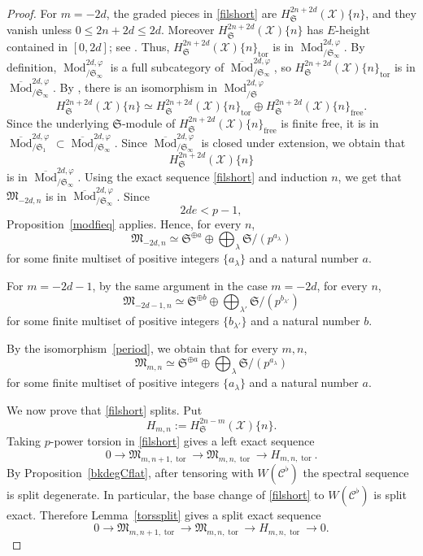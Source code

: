 \documentclass[11pt]{amsart}
\numberwithin{equation}{section}
\newcommand{\sC}{\mathcal{C}}
\newcommand{\BKMod}{\operatorname{Mod}_{/\mS}}
\newcommand{\BKModinf}{\operatorname{Mod}_{/\mS_{\infty}}}
\newcommand{\free}{\operatorname{free}}
\newcommand{\tors}{\operatorname{tor}}
\newcommand{\sX}{\mathcal{X}}
\newcommand{\mf}{\mathfrak}
\newcommand{\fM}{\mf{M}}
\newcommand{\Mod}{\operatorname{Mod}}
\newcommand{\mS}{\mf{S}}
\numberwithin{equation}{section}
\begin{document}
\begin{proof}
For $m=-2d$, the graded pieces in \eqref{filshort} are
$H_{\mS}^{2n+2d}(\sX)\{n\}$, and they vanish unless
$0\leq 2n+2d\leq 2d$. Moreover $H_{\mS}^{2n+2d}(\sX)\{n\}$ has $E$-height contained in $[0,2d]$; see
\cite[Theorem~1.8(6)]{BS21}. Thus, $H_{\mS}^{2n+2d}(\sX)\{n\}_{\tors}$ is in $\BKModinf^{2d,\varphi}$. By definition, $\BKModinf^{2d,\varphi}$ is a full subcategory of $\overline{\Mod}^{2d,\varphi}_{/\mS_\infty}$, so $H_{\mS}^{2n+2d}(\sX)\{n\}_{\tors}$ is in $\overline{\Mod}^{2d,\varphi}_{/\mS_\infty}$. By \cite[Theorem 5.11]{M21}, there is an isomorphism in $\BKMod^{2d,\varphi}$
\[
  H_{\mS}^{2n+2d}(\sX)\{n\} \simeq H_{\mS}^{2n+2d}(\sX)\{n\}_{\tors}\oplus H_{\mS}^{2n+2d}(\sX)\{n\}_{\free}.
  \] 
  Since the underlying $\mS$-module of $H_{\mS}^{2n+2d}(\sX)\{n\}_{\free}$ is finite free, it is in $\overline{\Mod}^{2d,\varphi}_{/\mS_1} \subset \overline{\Mod}^{2d,\varphi}_{/\mS_\infty}$. Since $\overline{\Mod}^{2d,\varphi}_{/\mS_\infty}$ is closed under extension, we obtain that 
  \[
    H_{\mS}^{2n+2d}(\sX)\{n\}
    \]
    is in $\overline{\Mod}^{2d,\varphi}_{/\mS_\infty}$. Using the exact sequence \eqref{filshort} and induction $n$, we get that $\fM_{-2d,n}$ is in $\overline{\Mod}^{2d,\varphi}_{/\mS_\infty}$. Since
\[
 2de<p-1,
\]
Proposition~\ref{modfieq} applies. Hence, for every $n$,
\begin{equation}\label{Mtors1}
  \fM_{-2d,n}
  \simeq \mS^{\oplus a} \oplus 
  \bigoplus_\lambda \mS/(p^{a_\lambda})
\end{equation}
for some finite multiset of positive integers $\{a_\lambda\}$ and a natural number $a$.

For $m=-2d-1$, by the same argument in the case $m=-2d$, for every $n$,
\begin{equation}\label{Mtors2}
  \fM_{-2d-1,n}
  \simeq\mS^{\oplus b} \oplus 
  \bigoplus_{\lambda'} \mS/(p^{b_{\lambda'}})
\end{equation}
for some finite multiset of positive integers $\{b_{\lambda'}\}$ and a natural number $b$.

By the isomorphism~\eqref{period}, we obtain that for every $m,n$,
\begin{equation}\label{Mtors}
  \fM_{m,n} 
  \simeq \mS^{\oplus a} \oplus 
  \bigoplus_\lambda \mS/(p^{a_\lambda})
\end{equation}
for some finite multiset of positive integers $\{a_\lambda\}$ and a natural number $a$.

We now prove that \eqref{filshort} splits. Put
\[
  H_{m,n}:=H_{\mS}^{2n-m}(\sX)\{n\}.
\]
Taking $p$-power torsion in \eqref{filshort} gives a left exact
sequence
\[
  0
  \to
  \fM_{m,n+1,\tors}
  \to
  \fM_{m,n,\tors}
  \to
  H_{m,n,\tors}.
\]
By Proposition~\ref{bkdegCflat}, after tensoring with $W(\sC^\flat)$ the
spectral sequence is split degenerate. In particular, the base change of
\eqref{filshort} to $W(\sC^\flat)$ is split exact. Therefore
Lemma~\ref{torssplit} gives a split exact sequence
\begin{equation}\label{torsrow}
  0
  \to
  \fM_{m,n+1,\tors}
  \to
  \fM_{m,n,\tors}
  \to
  H_{m,n,\tors}
  \to
  0.
\end{equation}


\end{proof}
\end{document}
